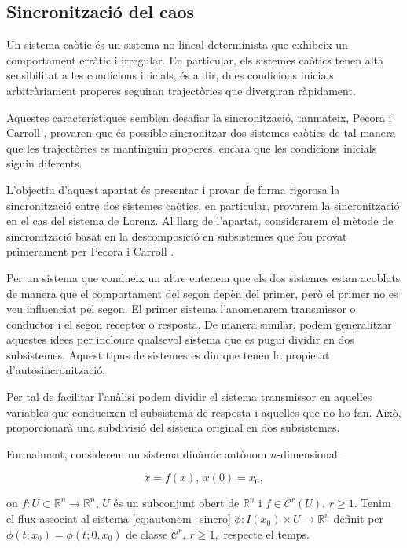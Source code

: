 \documentclass[11pt,a4paper,openright,oneside]{article}
\numberwithin{equation}{section}
\theoremstyle{definition}
\begin{document}
\subsection{Sincronització del caos} \label{sssec: Sincro_caotica}

Un sistema caòtic és un sistema no-lineal determinista que exhibeix un comportament erràtic i irregular. En particular, els sistemes caòtics tenen alta sensibilitat a les condicions inicials, és a dir, dues condicions inicials arbitràriament properes seguiran trajectòries que divergiran ràpidament.

Aquestes característiques semblen desafiar la sincronització, tanmateix, Pecora i Carroll \cite{Pecora_1}\cite{Pecora_2}, provaren que és possible sincronitzar dos sistemes caòtics de tal manera que les trajectòries es mantinguin properes, encara que les condicions inicials siguin diferents.

L'objectiu d'aquest apartat és presentar i provar de forma rigorosa la sincronització entre dos sistemes caòtics, en particular, provarem la sincronització en el cas del sistema de Lorenz. Al llarg de l'apartat, considerarem el mètode de sincronització basat en la descomposició en subsistemes que fou provat primerament per Pecora i Carroll \cite{Pecora_1}. 

Per un sistema que condueix un altre entenem que els dos sistemes estan acoblats de manera que el comportament del segon depèn del primer, però el primer no es veu influenciat pel segon. El primer sistema l'anomenarem transmissor o conductor i el segon receptor o resposta. De manera similar, podem generalitzar aquestes idees per incloure qualsevol sistema que es pugui dividir en dos subsistemes. Aquest tipus de sistemes es diu que tenen la propietat d'autosincronització.

Per tal de facilitar l'anàlisi podem dividir el sistema transmissor en aquelles variables que condueixen el subsistema de resposta i aquelles que no ho fan. Això, proporcionarà una subdivisió del sistema original en dos subsistemes.

Formalment, considerem un sistema dinàmic autònom $n$-dimensional:

\begin{equation} \label{eq:autonom_sincro}
    \dot{x}=f(x),\ x(0)=x_0,
\end{equation}

on $f:U\subset \mathbb{R}^n \rightarrow \mathbb{R}^n$, $U$ és un subconjunt obert de $\mathbb{R}^n$ i $f\in \mathcal{C}^r(U)$, $r\geq 1$. Tenim el flux associat al sistema \eqref{eq:autonom_sincro} $\phi:I(x_0)\times U\rightarrow \mathbb{R}^n$ definit per $\phi\left(t;x_0\right)=\phi\left(t;0, x_0\right)$ de classe $\mathcal{C}^r, \ r\geq 1,$ respecte el temps. 
\end{document}
